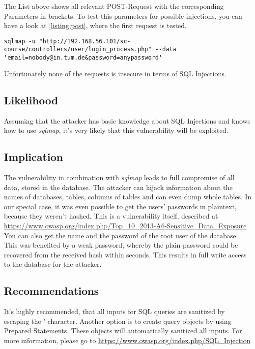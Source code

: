 The List above shows all relevant POST-Request with the corresponding Parameters in brackets. To test this parameters for possible injections, you can have a look at \ref{listing:post}, where the first request is tested.

\begin{lstlisting}[caption=Testing POST parameters for injections,label=listing:post]
sqlmap -u "http://192.168.56.101/sc-course/controllers/user/login_process.php" --data 'email=nobody@in.tum.de&password=anypassword'

\end{lstlisting}
Unfortunately none of the requests is insecure in terms of SQL Injections.

\subsection{Likelihood}
Assuming that the attacker has basic knowledge about SQL Injections and knows how to use \textit{sqlmap}, it's very likely that this vulnerability will be exploited.


\subsection{Implication}
The vulnerability in combination with \textit{sqlmap} leads to full compromise of all data, stored in the database. The attacker can hijack information about the names of databases, tables, columns of tables and can even dump whole tables.  In our special case, it was even possible to get the users' passwords in plaintext, because they weren't hashed. This is a vulnerability itself, described at \url{https://www.owasp.org/index.php/Top_10_2013-A6-Sensitive_Data_Exposure}
You can also get the name and the password of the root user of the database. This was benefited by a weak password, whereby the plain password could be recovered from the received hash within seconds. This results in full write access to the database for the attacker.


\subsection{Recommendations}
It's highly recommended, that all inputs for SQL queries are sanitized by escaping the ' character.
Another option is to create query objects by using  Prepared Statements.
These objects will automatically sanitized all inputs. For more information, please go to \url{https://www.owasp.org/index.php/SQL\_Injection}

